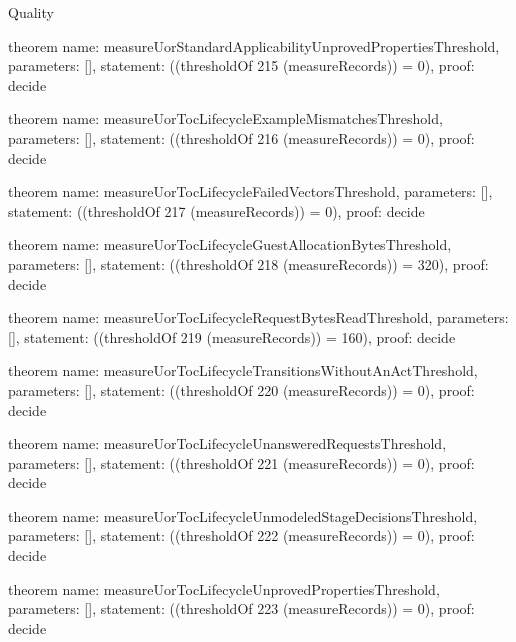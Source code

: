\begin{lexlean}{Quality}
\begin{semanticmodule}
theorem{
  name: measureUorStandardApplicabilityUnprovedPropertiesThreshold,
  parameters: [],
  statement: ((thresholdOf 215 (measureRecords)) = 0),
  proof: decide{}
}

theorem{
  name: measureUorTocLifecycleExampleMismatchesThreshold,
  parameters: [],
  statement: ((thresholdOf 216 (measureRecords)) = 0),
  proof: decide{}
}

theorem{
  name: measureUorTocLifecycleFailedVectorsThreshold,
  parameters: [],
  statement: ((thresholdOf 217 (measureRecords)) = 0),
  proof: decide{}
}

theorem{
  name: measureUorTocLifecycleGuestAllocationBytesThreshold,
  parameters: [],
  statement: ((thresholdOf 218 (measureRecords)) = 320),
  proof: decide{}
}

theorem{
  name: measureUorTocLifecycleRequestBytesReadThreshold,
  parameters: [],
  statement: ((thresholdOf 219 (measureRecords)) = 160),
  proof: decide{}
}

theorem{
  name: measureUorTocLifecycleTransitionsWithoutAnActThreshold,
  parameters: [],
  statement: ((thresholdOf 220 (measureRecords)) = 0),
  proof: decide{}
}

theorem{
  name: measureUorTocLifecycleUnansweredRequestsThreshold,
  parameters: [],
  statement: ((thresholdOf 221 (measureRecords)) = 0),
  proof: decide{}
}

theorem{
  name: measureUorTocLifecycleUnmodeledStageDecisionsThreshold,
  parameters: [],
  statement: ((thresholdOf 222 (measureRecords)) = 0),
  proof: decide{}
}

theorem{
  name: measureUorTocLifecycleUnprovedPropertiesThreshold,
  parameters: [],
  statement: ((thresholdOf 223 (measureRecords)) = 0),
  proof: decide{}
}
\end{semanticmodule}
\end{lexlean}
